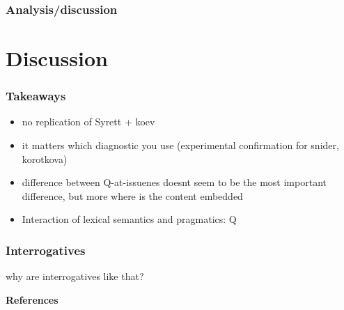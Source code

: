 \documentclass[compress, xcolor = dvipsnames, aspectratio=169]{beamer}
\begin{document}
	\begin{frame}[t]\frametitle{Analysis/discussion}

	\end{frame}

\section{Discussion}
	
	\begin{frame}[t]\frametitle{Takeaways}
	
		\begin{itemize}
			\item no replication of Syrett + koev
			\item it matters which diagnostic you use (experimental confirmation for snider, korotkova)
			\item difference between Q-at-issuenes doesnt seem to be the most important difference, but more where is the content embedded 
			\item Interaction of lexical semantics and pragmatics: Q
		\end{itemize}
	
	\end{frame}

	\begin{frame}[t]\frametitle{Interrogatives}
	
		why are interrogatives like that?
	
	\end{frame}

\begin{frame}[allowframebreaks]{\bfseries\opt References}
	\footnotesize
	
	

\end{frame}
\end{document}
